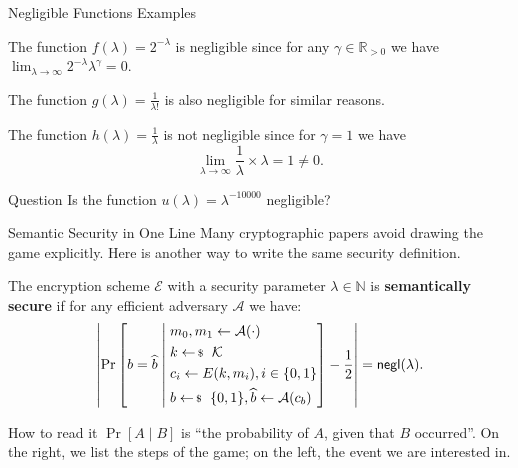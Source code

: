 \documentclass{zkdl-presentation-template}
\begin{document}
    \begin{frame}{Negligible Functions Examples}
        \begin{example}
            The function $f(\lambda) = 2^{-\lambda}$ is negligible since for any $\gamma \in \mathbb{R}_{>0}$ we have $\lim_{\lambda \to \infty} 2^{-\lambda}\lambda^{\gamma} = 0$.

            The function $g(\lambda) = \frac{1}{\lambda!}$ is also negligible for similar reasons.
        \end{example}
        \pause

        \begin{example}
            The function $h(\lambda) = \frac{1}{\lambda}$ is not negligible since for $\gamma = 1$ we have
            \begin{equation*}
                \lim_{\lambda \to \infty} \frac{1}{\lambda} \times \lambda = 1 \neq 0.
            \end{equation*}
        \end{example}
        \pause

        \begin{questionblock}{Question}
            Is the function $u(\lambda) = \lambda^{-10000}$ negligible?
        \end{questionblock}
    \end{frame}

    \begin{frame}{Semantic Security in One Line}
        Many cryptographic papers avoid drawing the game explicitly. Here is another way to write the same security definition.
        \pause

        \begin{definition}
            The encryption scheme $\mathcal{E}$ with a security parameter $\lambda \in \mathbb{N}$ is \textbf{semantically secure} if for any efficient adversary $\mathcal{A}$ we have:
            \begin{equation*}
                \left|\Pr\left[
                    b = \widehat{b}
                    \;\middle|\;
                \begin{aligned}
                    &m_0, m_1 \gets \mathcal{A}(\cdot) \\
                    &k \leftarrowS \mathcal{K} \\
                    &c_i \gets E(k,m_i), i \in \{0,1\}\\
                    &b \leftarrowS \{0,1\}, \widehat{b} \gets \mathcal{A}(c_b) \\
                \end{aligned}\right] - \frac{1}{2}\right| = \negl(\lambda).
            \end{equation*}
        \end{definition}
        \pause

        \begin{remarkblock}{How to read it}
            $\Pr[A \mid B]$ is ``the probability of $A$, given that $B$ occurred''. On the right, we list the steps of the game; on the left, the event we are interested in.
        \end{remarkblock}
    \end{frame}
\end{document}
